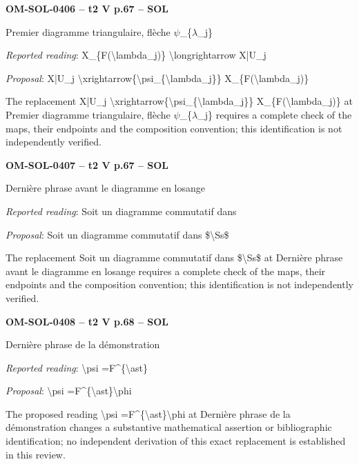\par\noindent\textbf{OM-SOL-0406 -- t2 V p.67 -- SOL}\par
Premier diagramme triangulaire, flèche \ensuremath{\psi}\_\{\ensuremath{\lambda}\_j\}\par
\emph{Reported reading}: X\_\{F(\textbackslash{}lambda\_j)\} \textbackslash{}longrightarrow X|U\_j\par
\emph{Proposal}: X|U\_j \textbackslash{}xrightarrow\{\textbackslash{}psi\_\{\textbackslash{}lambda\_j\}\} X\_\{F(\textbackslash{}lambda\_j)\}\par
The replacement X|U\_j \textbackslash{}xrightarrow\{\textbackslash{}psi\_\{\textbackslash{}lambda\_j\}\} X\_\{F(\textbackslash{}lambda\_j)\} at Premier diagramme triangulaire, flèche \ensuremath{\psi}\_\{\ensuremath{\lambda}\_j\} requires a complete check of the maps, their endpoints and the composition convention; this identification is not independently verified.\par
\par\noindent\textbf{OM-SOL-0407 -- t2 V p.67 -- SOL}\par
Dernière phrase avant le diagramme en losange\par
\emph{Reported reading}: Soit un diagramme commutatif dans\par
\emph{Proposal}: Soit un diagramme commutatif dans \$\textbackslash{}Ss\$\par
The replacement Soit un diagramme commutatif dans \$\textbackslash{}Ss\$ at Dernière phrase avant le diagramme en losange requires a complete check of the maps, their endpoints and the composition convention; this identification is not independently verified.\par
\par\noindent\textbf{OM-SOL-0408 -- t2 V p.68 -- SOL}\par
Dernière phrase de la démonstration\par
\emph{Reported reading}: \textbackslash{}psi =\allowbreak  F\textasciicircum{}\{\textbackslash{}ast\}\par
\emph{Proposal}: \textbackslash{}psi =\allowbreak  F\textasciicircum{}\{\textbackslash{}ast\}\textbackslash{}phi\par
The proposed reading \textbackslash{}psi =\allowbreak  F\textasciicircum{}\{\textbackslash{}ast\}\textbackslash{}phi at Dernière phrase de la démonstration changes a substantive mathematical assertion or bibliographic identification; no independent derivation of this exact replacement is established in this review.\par
